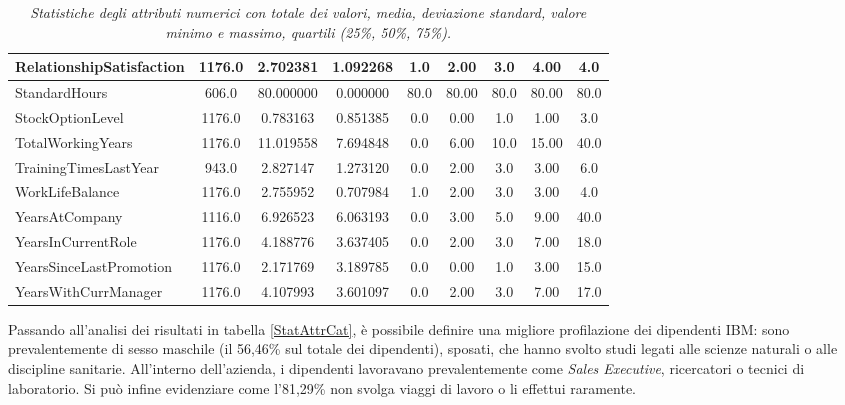 \begin{table}[H]
{\begin{tabular}{|l|c|c|c|c|c|c|c|c|}
RelationshipSatisfaction & 1176.0 & 2.702381     & 1.092268    & 1.0    & 2.00    & 3.0     & 4.00     & 4.0     \\ \hline
StandardHours            & 606.0  & 80.000000    & 0.000000    & 80.0   & 80.00   & 80.0    & 80.00    & 80.0    \\ \hline
StockOptionLevel         & 1176.0 & 0.783163     & 0.851385    & 0.0    & 0.00    & 1.0     & 1.00     & 3.0     \\ \hline
TotalWorkingYears        & 1176.0 & 11.019558    & 7.694848    & 0.0    & 6.00    & 10.0    & 15.00    & 40.0    \\ \hline
TrainingTimesLastYear    & 943.0  & 2.827147     & 1.273120    & 0.0    & 2.00    & 3.0     & 3.00     & 6.0     \\ \hline
WorkLifeBalance          & 1176.0 & 2.755952     & 0.707984    & 1.0    & 2.00    & 3.0     & 3.00     & 4.0     \\ \hline
YearsAtCompany           & 1116.0 & 6.926523     & 6.063193    & 0.0    & 3.00    & 5.0     & 9.00     & 40.0    \\ \hline
YearsInCurrentRole       & 1176.0 & 4.188776     & 3.637405    & 0.0    & 2.00    & 3.0     & 7.00     & 18.0    \\ \hline
YearsSinceLastPromotion  & 1176.0 & 2.171769     & 3.189785    & 0.0    & 0.00    & 1.0     & 3.00     & 15.0    \\ \hline
YearsWithCurrManager     & 1176.0 & 4.107993     & 3.601097    & 0.0    & 2.00    & 3.0     & 7.00     & 17.0    \\ \hline
\end{tabular}
}    

\caption{\textit{Statistiche degli attributi numerici con totale dei valori, media, deviazione standard, valore minimo e massimo, quartili (25\%, 50\%, 75\%).}}
 \label{statAttrNum}
\end{table}
\noindent 
Passando all'analisi dei risultati in tabella \ref{StatAttrCat}, è possibile definire una migliore profilazione dei dipendenti IBM: sono prevalentemente di sesso maschile (il 56,46\% sul totale dei dipendenti), sposati, che hanno svolto studi legati alle scienze naturali o alle discipline sanitarie. All'interno dell'azienda, i dipendenti lavoravano prevalentemente come \textit{Sales Executive}, ricercatori o tecnici di laboratorio. Si può infine evidenziare come l'81,29\% non svolga viaggi di lavoro o li effettui raramente.
